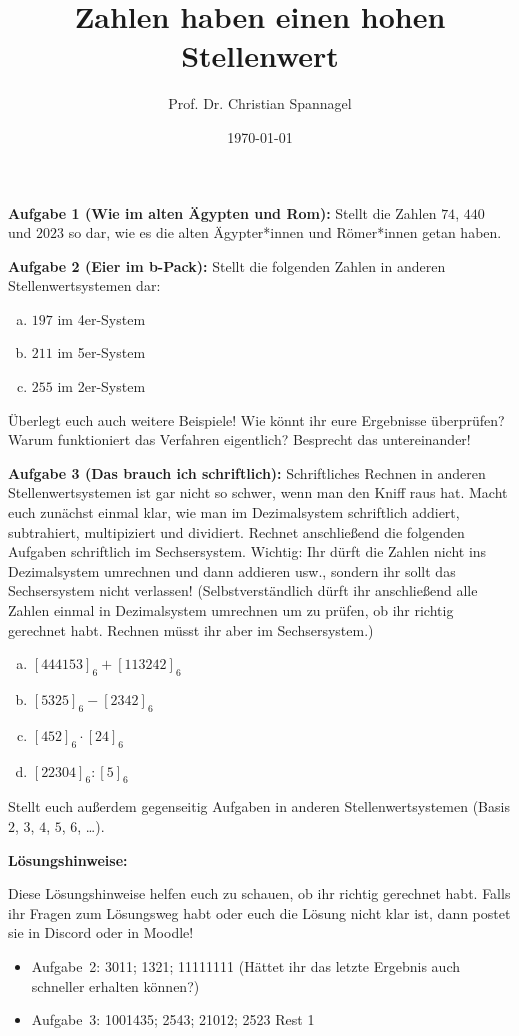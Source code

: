 \documentclass{../cssheet}
\title{Zahlen haben einen hohen Stellenwert}
\author{Prof. Dr. Christian Spannagel}
\date{\today}
\begin{document}
\printtitle

\textbf{Aufgabe 1 (Wie im alten Ägypten und Rom):}  Stellt die Zahlen $74$, $440$ und $2023$ so dar, wie es die alten Ägypter*innen und Römer*innen getan haben.

\textbf{Aufgabe 2 (Eier im b-Pack):} Stellt die folgenden Zahlen in anderen Stellenwertsystemen dar:
\begin{enumerate}[a)]
\item $197$ im 4er-System
\item $211$ im 5er-System
\item $255$ im 2er-System
\end{enumerate}
Überlegt euch auch weitere Beispiele! Wie könnt ihr eure Ergebnisse überprüfen?
Warum funktioniert das Verfahren eigentlich? Besprecht das untereinander!

\textbf{Aufgabe 3 (Das brauch ich schriftlich):}  Schriftliches Rechnen in anderen Stellenwertsystemen ist gar nicht so schwer, wenn man den Kniff raus hat. Macht euch zunächst einmal klar, wie man im Dezimalsystem schriftlich addiert, subtrahiert, multipiziert und dividiert. Rechnet anschließend die folgenden Aufgaben schriftlich im Sechsersystem. Wichtig: Ihr dürft die Zahlen nicht ins Dezimalsystem umrechnen und dann addieren usw., sondern ihr sollt das Sechsersystem nicht verlassen! (Selbstverständlich dürft ihr anschließend alle Zahlen einmal in Dezimalsystem umrechnen um zu prüfen, ob ihr richtig gerechnet habt. Rechnen müsst ihr aber im Sechsersystem.)

\begin{enumerate}[a)]
\item $[444153]_6 + [113242]_6$
\item $[5325]_6 - [2342]_6$
\item $[452]_6 \cdot [24]_6$
\item $[22304]_6 : [5]_6$
\end{enumerate}

Stellt euch außerdem gegenseitig Aufgaben in anderen Stellenwertsystemen (Basis $2$, $3$, $4$, $5$, $6$, \ldots).

\textbf{Lösungshinweise:} 

Diese Lösungshinweise helfen euch zu schauen, ob ihr richtig gerechnet habt. Falls ihr Fragen zum Lösungsweg habt oder euch die Lösung nicht klar ist, dann postet sie in Discord oder in Moodle!

\begin{itemize}
\item Aufgabe~2: 3011; 1321; 11111111 (Hättet ihr das letzte Ergebnis auch schneller erhalten können?)
\item Aufgabe~3: 1001435; 2543; 21012; 2523 Rest 1
\end{itemize}

\vspace*{10mm}
\printlicense

\printsocials
\end{document}
